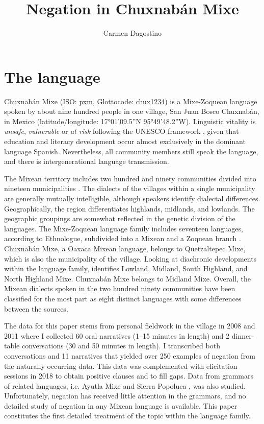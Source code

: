 \documentclass[output=paper,colorlinks,citecolor=brown,draft]{langscibook}
\author{Carmen Dagostino\affiliation{California State University, San Bernardino}}
\title{Negation in Chuxnabán Mixe}
\begin{document}
\maketitle 
\section{The language}\label{sec:mix:1}

Chuxnabán Mixe (ISO: \href{https://iso639-3.sil.org/code/pxm}{pxm}, Glottocode: \href{https://glottolog.org/resource/languoid/id/chux1234}{chux1234}) is a Mixe-Zoquean language spoken by about nine hundred people in one village, San Juan Bosco Chuxnabán, in Mexico (latitude/longitude: 17°01’09.5”N 95°49’48.2”W). Linguistic vitality is \textit{unsafe}, \textit{vulnerable} or \textit{at risk} following the UNESCO framework \citep{BrenzingerEtAl2003}, given that education and literacy development occur almost exclusively in the dominant language Spanish. Nevertheless, all community members still speak the language, and there is intergenerational language transmission.

The Mixean territory includes two hundred and ninety communities divided into nineteen municipalities \citep{TorresCisneros1997}. The dialects of the villages within a single municipality are generally mutually intelligible, although speakers identify dialectal differences. Geographically, the region differentiates highlands, midlands, and lowlands. The geographic groupings are somewhat reflected in the genetic division of the languages. The Mixe-Zoquean language family includes seventeen languages, according to Ethnologue, subdivided into a Mixean and a Zoquean branch \citep{EberhardEtAl2019}. Chuxnabán Mixe, a Oaxaca Mixean language, belongs to Quetzaltepec Mixe, which is also the municipality of the village. Looking at diachronic developments within the language family, \citet[10]{Wichmann1995} identifies Lowland, Midland, South Highland, and North Highland Mixe. Chuxnabán Mixe belongs to Midland Mixe. Overall, the Mixean dialects spoken in the two hundred ninety communities have been classified for the most part as eight distinct languages with some differences between the sources. 

The data for this paper stems from personal fieldwork in the village in 2008 and 2011 where I collected 60 oral narratives (1--15 minutes in length) and 2 dinner-table conversations (30 and 50 minutes in length). I transcribed both conversations and 11 narratives that yielded over 250 examples of negation from the naturally occurring data. This data was complemented with elicitation sessions in 2018 to obtain positive clauses and to fill gaps. Data from grammars of related languages, i.e. Ayutla Mixe \citep{Romero-Méndez2009} and Sierra Popoluca \citep{Boudreault2018}, was also studied. Unfortunately, negation has received little attention in the grammars, and no detailed study of negation in any Mixean language is available. This paper constitutes the first detailed treatment of the topic within the language family.
\end{document}
